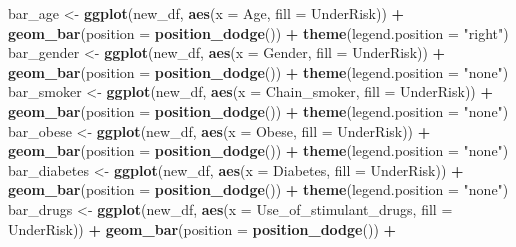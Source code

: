 \documentclass[
  10pt,
  spanish,
]{article}
\newenvironment{Shaded}{\begin{snugshade}}{\end{snugshade}}
\newcommand{\DataTypeTok}[1]{\textcolor[rgb]{0.13,0.29,0.53}{#1}}
\newcommand{\KeywordTok}[1]{\textcolor[rgb]{0.13,0.29,0.53}{\textbf{#1}}}
\newcommand{\NormalTok}[1]{#1}
\newcommand{\OperatorTok}[1]{\textcolor[rgb]{0.81,0.36,0.00}{\textbf{#1}}}
\newcommand{\StringTok}[1]{\textcolor[rgb]{0.31,0.60,0.02}{#1}}
\begin{document}
\begin{Shaded}
\begin{Highlighting}[]
\NormalTok{bar\_age \textless{}{-}}\StringTok{ }\KeywordTok{ggplot}\NormalTok{(new\_df, }\KeywordTok{aes}\NormalTok{(}\DataTypeTok{x =}\NormalTok{ Age, }\DataTypeTok{fill =}\NormalTok{ UnderRisk)) }\OperatorTok{+}
\StringTok{    }\KeywordTok{geom\_bar}\NormalTok{(}\DataTypeTok{position =} \KeywordTok{position\_dodge}\NormalTok{()) }\OperatorTok{+}
\StringTok{    }\KeywordTok{theme}\NormalTok{(}\DataTypeTok{legend.position =} \StringTok{"right"}\NormalTok{)}
\NormalTok{bar\_gender \textless{}{-}}\StringTok{ }\KeywordTok{ggplot}\NormalTok{(new\_df, }\KeywordTok{aes}\NormalTok{(}\DataTypeTok{x =}\NormalTok{ Gender, }\DataTypeTok{fill =}\NormalTok{ UnderRisk)) }\OperatorTok{+}
\StringTok{    }\KeywordTok{geom\_bar}\NormalTok{(}\DataTypeTok{position =} \KeywordTok{position\_dodge}\NormalTok{()) }\OperatorTok{+}
\StringTok{    }\KeywordTok{theme}\NormalTok{(}\DataTypeTok{legend.position =} \StringTok{"none"}\NormalTok{)}
\NormalTok{bar\_smoker \textless{}{-}}\StringTok{ }\KeywordTok{ggplot}\NormalTok{(new\_df, }\KeywordTok{aes}\NormalTok{(}\DataTypeTok{x =}\NormalTok{ Chain\_smoker, }\DataTypeTok{fill =}\NormalTok{ UnderRisk)) }\OperatorTok{+}
\StringTok{    }\KeywordTok{geom\_bar}\NormalTok{(}\DataTypeTok{position =} \KeywordTok{position\_dodge}\NormalTok{()) }\OperatorTok{+}
\StringTok{    }\KeywordTok{theme}\NormalTok{(}\DataTypeTok{legend.position =} \StringTok{"none"}\NormalTok{)}
\NormalTok{bar\_obese \textless{}{-}}\StringTok{ }\KeywordTok{ggplot}\NormalTok{(new\_df, }\KeywordTok{aes}\NormalTok{(}\DataTypeTok{x =}\NormalTok{ Obese, }\DataTypeTok{fill =}\NormalTok{ UnderRisk)) }\OperatorTok{+}
\StringTok{    }\KeywordTok{geom\_bar}\NormalTok{(}\DataTypeTok{position =} \KeywordTok{position\_dodge}\NormalTok{()) }\OperatorTok{+}
\StringTok{    }\KeywordTok{theme}\NormalTok{(}\DataTypeTok{legend.position =} \StringTok{"none"}\NormalTok{)}
\NormalTok{bar\_diabetes \textless{}{-}}\StringTok{ }\KeywordTok{ggplot}\NormalTok{(new\_df, }\KeywordTok{aes}\NormalTok{(}\DataTypeTok{x =}\NormalTok{ Diabetes, }\DataTypeTok{fill =}\NormalTok{ UnderRisk)) }\OperatorTok{+}
\StringTok{    }\KeywordTok{geom\_bar}\NormalTok{(}\DataTypeTok{position =} \KeywordTok{position\_dodge}\NormalTok{()) }\OperatorTok{+}
\StringTok{    }\KeywordTok{theme}\NormalTok{(}\DataTypeTok{legend.position =} \StringTok{"none"}\NormalTok{)}
\NormalTok{bar\_drugs \textless{}{-}}\StringTok{ }\KeywordTok{ggplot}\NormalTok{(new\_df, }\KeywordTok{aes}\NormalTok{(}\DataTypeTok{x =}\NormalTok{ Use\_of\_stimulant\_drugs, }\DataTypeTok{fill =}\NormalTok{ UnderRisk)) }\OperatorTok{+}
\StringTok{    }\KeywordTok{geom\_bar}\NormalTok{(}\DataTypeTok{position =} \KeywordTok{position\_dodge}\NormalTok{()) }\OperatorTok{+}

\end{Highlighting}
\end{Shaded}
\end{document}

